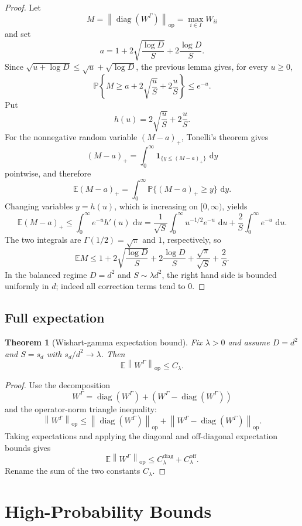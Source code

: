 \documentclass[11pt,oneside]{book}
\newtheorem{theorem}{Theorem}[chapter]
\DeclareMathOperator{\diag}{diag}
\newcommand{\E}{\mathbb E}
\newcommand{\Prob}{\mathbb P}
\newcommand{\1}{\mathbf 1}
\newcommand{\pt}{\Gamma}
\newcommand{\op}{\mathrm{op}}
\newcommand{\dd}{\,\mathrm d}
\newcommand{\norm}[1]{\left\|#1\right\|}
\begin{document}
\begin{proof}
Let
\[
  M=\norm{\diag(W^\pt)}_{\op}=\max_{i\in I}W_{ii}
\]
and set
\[
  a=1+2\sqrt{\frac{\log D}{S}}+2\frac{\log D}{S}.
\]
Since \(\sqrt{u+\log D}\le \sqrt u+\sqrt{\log D}\), the previous lemma gives,
for every \(u\ge0\),
\[
  \Prob\left\{
    M\ge a+2\sqrt{\frac uS}+2\frac uS
  \right\}
  \le e^{-u}.
\]
Put
\[
  h(u)=2\sqrt{\frac uS}+2\frac uS.
\]
For the nonnegative random variable \((M-a)_+\), Tonelli's theorem gives
\[
  (M-a)_+=\int_0^\infty \1_{\{y\le (M-a)_+\}}\,\dd y
\]
pointwise, and therefore
\[
  \E(M-a)_+=\int_0^\infty \Prob\{(M-a)_+\ge y\}\,\dd y .
\]
Changing variables \(y=h(u)\), which is increasing on \([0,\infty)\), yields
\[
  \E(M-a)_+
  \le
  \int_0^\infty e^{-u}h'(u)\,\dd u
  =
  \frac1{\sqrt S}\int_0^\infty u^{-1/2}e^{-u}\,\dd u
  +\frac2S\int_0^\infty e^{-u}\,\dd u .
\]
The two integrals are \(\Gamma(1/2)=\sqrt\pi\) and \(1\), respectively, so
\[
  \E M
  \le
  1+2\sqrt{\frac{\log D}{S}}+2\frac{\log D}{S}
  +\frac{\sqrt\pi}{\sqrt S}+\frac2S.
\]
In the balanced regime \(D=d^2\) and \(S\sim\lambda d^2\), the right hand side
is bounded uniformly in \(d\); indeed all correction terms tend to \(0\).
\end{proof}

\section{Full expectation}

\begin{theorem}[Wishart-gamma expectation bound]
Fix \(\lambda>0\) and assume \(D=d^2\) and \(S=s_d\) with
\(s_d/d^2\to\lambda\).  Then
\[
  \E\norm{W^\pt}_{\op}\le C_\lambda.
\]
\end{theorem}

\begin{proof}
Use the decomposition
\[
  W^\pt=\diag(W^\pt)+(W^\pt-\diag(W^\pt))
\]
and the operator-norm triangle inequality:
\[
  \norm{W^\pt}_{\op}
  \le
  \norm{\diag(W^\pt)}_{\op}
  +
  \norm{W^\pt-\diag(W^\pt)}_{\op}.
\]
Taking expectations and applying the diagonal and off-diagonal expectation
bounds gives
\[
  \E\norm{W^\pt}_{\op}
  \le C_\lambda^{\mathrm{diag}}+C_\lambda^{\mathrm{off}}.
\]
Rename the sum of the two constants \(C_\lambda\).
\end{proof}

\chapter{High-Probability Bounds}
\end{document}
